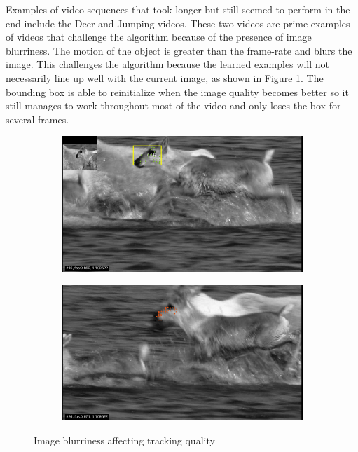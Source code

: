 \documentclass[10pt,twocolumn,letterpaper]{article}
\begin{document}
Examples of video sequences that took longer but still seemed to perform in the end include the Deer and Jumping videos. These two videos are prime examples of videos that challenge the algorithm because of the presence of image blurriness. The motion of the object is greater than the frame-rate and blurs the image. This challenges the algorithm because the learned examples will not necessarily line up well with the current image, as shown in Figure \ref{fig:deer}. The bounding box is able to reinitialize when the image quality becomes better so it still manages to work throughout most of the video and only loses the box for several frames. \\
\begin{figure}
\begin{centering}
\begin{subfigure}[b]{0.4\textwidth}
\includegraphics[width=\textwidth]{deer1}
\end{subfigure}
\begin{subfigure}[b]{0.4\textwidth}
\includegraphics[width=\textwidth]{deer2}
\end{subfigure}
\caption{Image blurriness affecting tracking quality}
\label{fig:deer}
\end{centering}
\end{figure}
\end{document}
